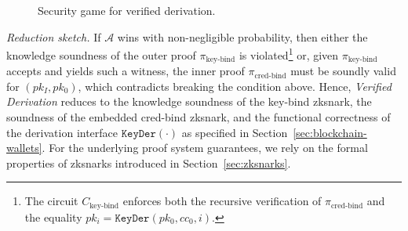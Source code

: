 \begin{figure}[t]
	\centering
	\begin{gameproof}[name=\mathsf{Exp}^{\mathsf{VD}}, arg=(1^{\lambda}), nr=0]
		\makeatletter
		\renewcommand\@pc@gametitle[1][]{\ensuremath{\pcgame[\mathcal{A}]\gameprocedurearg}}
		\makeatother
	\end{gameproof}
	\caption{Security game for verified derivation.}
	\label{fig:game-verified-derivation}
\end{figure}

\medskip
\textit{Reduction sketch.}
If $\mathcal{A}$ wins with non-negligible probability, then either the knowledge soundness of the outer proof $\pi_{\text{key-bind}}$ is violated\footnote{The circuit $C_{\text{key-bind}}$ enforces both the recursive verification of $\pi_{\text{cred-bind}}$ and the equality $pk_i=\texttt{KeyDer}(pk_0,cc_0,i)$.} or, given $\pi_{\text{key-bind}}$ accepts and yields such a witness, the inner proof $\pi_{\text{cred-bind}}$ must be soundly valid for $(pk_I,pk_0)$, which contradicts breaking the condition above. Hence, \emph{Verified Derivation} reduces to the knowledge soundness of the key-bind \acrshort{zksnark}, the soundness of the embedded cred-bind \acrshort{zksnark}, and the functional correctness of the derivation interface $\texttt{KeyDer}(\cdot)$ as specified in Section~\ref{sec:blockchain-wallets}. For the underlying proof system guarantees, we rely on the formal properties of \acrshort{zksnark}s introduced in Section~\ref{sec:zksnarks}.

